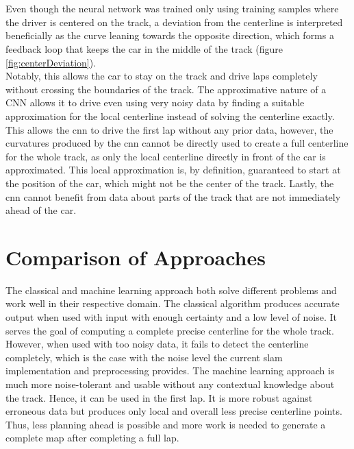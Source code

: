 $ $\\\\\\Even though the neural network was trained only using training samples where the driver is centered on the track, a deviation from the centerline is interpreted beneficially as the curve leaning towards the opposite direction, which forms a feedback loop that keeps the car in the middle of the track (figure \ref{fig:centerDeviation}).
\\Notably, this allows the car to stay on the track and drive laps completely without crossing the boundaries of the track. The approximative nature of a CNN allows it to drive even using very noisy data by finding a suitable approximation for the local centerline instead of solving the centerline exactly. This allows the \ac{cnn} to drive the first lap without any prior data, however, the curvatures produced by the \ac{cnn} cannot be directly used to create a full centerline for the whole track, as only the local centerline directly in front of the car is approximated. This local approximation is, by definition, guaranteed to start at the position of the car, which might not be the center of the track. Lastly, the \ac{cnn} cannot benefit from data about parts of the track that are not immediately ahead of the car.


\section{Comparison of Approaches}

The classical and machine learning approach both solve different problems and work well in their respective domain. The classical algorithm produces accurate output when used with input with enough certainty and a low level of noise. It serves the goal of computing a complete precise centerline for the whole track. However, when used with too noisy data, it fails to detect the centerline completely, which is the case with the noise level the current \ac{slam} implementation and preprocessing provides. The machine learning approach is much more noise-tolerant and usable without any contextual knowledge about the track. Hence, it can be used in the first lap. It is more robust against erroneous data but produces only local and overall less precise centerline points. Thus, less planning ahead is possible and more work is needed to generate a complete map after completing a full lap.

